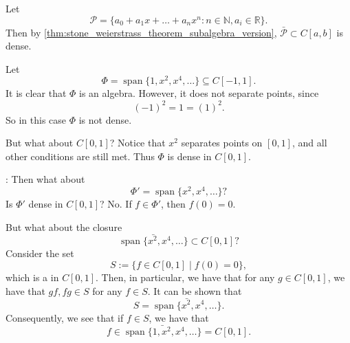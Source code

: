 \documentclass[notoc,notitlepage]{tufte-book}
\DeclareMathOperator{\Span}{span }
\begin{document}
\begin{eg}
  Let
  \begin{equation*}
    \mathcal{P} = \{ a_0 + a_1 x + \hdots + a_n x^n : n \in \mathbb{N}, a_i \in \mathbb{R} \}.
  \end{equation*}
  Then by \cref{thm:stone_weierstrass_theorem_subalgebra_version}, $\bar{\mathcal{P}} \subset C[a, b]$ is dense.
\end{eg}


  Let
  \begin{equation*}
    \Phi = \Span \{ 1, x^2, x^4, \ldots \} \subseteq C[-1, 1].
  \end{equation*}
  It is clear that $\Phi$ is an algebra. However, it does not separate points, since
  \begin{equation*}
    (-1)^2 = 1 = (1)^2.
  \end{equation*}
  So in this case $\Phi$ is not dense.

  But what about $C[0, 1]$? Notice that $x^2$ separates points on $[0, 1]$, and all other conditions are still met. Thus $\Phi$ is dense in $C[0, 1]$.


: Then what about
\begin{equation*}
  \Phi' = \Span \{ x^2, x^4, \ldots \}?
\end{equation*}
Is $\Phi'$ dense in $C[0, 1]$? No. If $f \in \Phi'$, then $f(0) = 0$.

But what about the closure
\begin{equation*}
  \bar{ \Span \{ x^2, x^4, \ldots \} } \subset C[0, 1]?
\end{equation*}
Consider the set
\begin{equation*}
  S := \{ f \in C[0, 1] \mid f(0) = 0 \},
\end{equation*}
which is a  in $C[0, 1]$. Then, in particular, we have that for any $g \in C[0, 1]$, we have that $gf, fg \in S$ for any $f \in S$. It can be shown that
\begin{equation*}
  S = \bar{ \Span \{ x^2, x^4, \ldots \} }.
\end{equation*}
Consequently, we see that if $f \in S$, we have that
\begin{equation*}
  f \in \bar{\Span\{ 1, x^2, x^4, \ldots \} } = C[0, 1].
\end{equation*}
\end{document}
